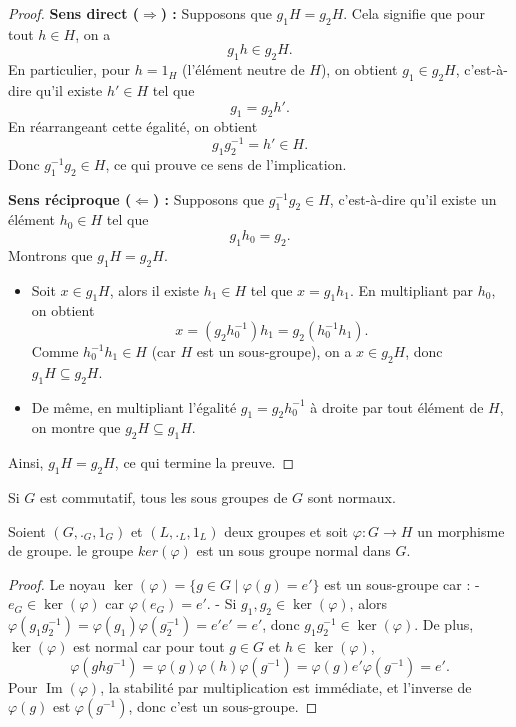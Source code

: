 \begin{proof}
\textbf{Sens direct (\(\Rightarrow\)) :}  
Supposons que \( g_1H = g_2H \). Cela signifie que pour tout \( h \in H \), on a  
\[
g_1 h \in g_2 H.
\]
En particulier, pour \( h = 1_H \) (l’élément neutre de \( H \)), on obtient \( g_1 \in g_2H \), c’est-à-dire qu’il existe \( h' \in H \) tel que  
\[
g_1 = g_2 h'.
\]
En réarrangeant cette égalité, on obtient  
\[
g_1 g_2^{-1} = h' \in H.
\]
Donc \( g_1^{-1} g_2 \in H \), ce qui prouve ce sens de l’implication.

\textbf{Sens réciproque (\(\Leftarrow\)) :}  
Supposons que \( g_1^{-1} g_2 \in H \), c’est-à-dire qu’il existe un élément \( h_0 \in H \) tel que  
\[
g_1 h_0 = g_2.
\]
Montrons que \( g_1H = g_2H \).  
\begin{itemize}
    \item Soit \( x \in g_1 H \), alors il existe \( h_1 \in H \) tel que \( x = g_1 h_1 \).  
    En multipliant par \( h_0 \), on obtient  
    \[
    x = (g_2 h_0^{-1}) h_1 = g_2 (h_0^{-1} h_1).
    \]
    Comme \( h_0^{-1} h_1 \in H \) (car \( H \) est un sous-groupe), on a \( x \in g_2H \), donc \( g_1H \subseteq g_2H \).
    \item De même, en multipliant l'égalité \( g_1 = g_2 h_0^{-1} \) à droite par tout élément de \( H \), on montre que \( g_2H \subseteq g_1H \).
\end{itemize}

Ainsi, \( g_1H = g_2H \), ce qui termine la preuve.  
\end{proof}

\begin{remarque}
    Si $G$ est commutatif, tous les sous groupes de $G$ sont normaux.
\end{remarque}

\begin{proposition}
Soient $(G,._G,1_G)$ et $(L,._L,1_L)$ deux groupes et soit $\varphi:G\to H$ un morphisme de groupe. le groupe $ker(\varphi)$ est un sous groupe normal dans $G$.
\end{proposition}

\begin{proof}
    Le noyau $\ker(\varphi) = \{ g \in G \mid \varphi(g) = e' \}$ est un sous-groupe car :
- $e_G \in \ker(\varphi)$ car $\varphi(e_G) = e'$.
- Si $g_1, g_2 \in \ker(\varphi)$, alors $\varphi(g_1 g_2^{-1}) = \varphi(g_1) \varphi(g_2^{-1}) = e' e' = e'$, donc $g_1 g_2^{-1} \in \ker(\varphi)$.\newline
De plus, $\ker(\varphi)$ est normal car pour tout $g \in G$ et $h \in \ker(\varphi)$,
\[
    \varphi(g h g^{-1}) = \varphi(g) \varphi(h) \varphi(g^{-1}) = \varphi(g) e' \varphi(g^{-1}) = e'.
\]
Pour $\operatorname{Im}(\varphi)$, la stabilité par multiplication est immédiate, et l'inverse de $\varphi(g)$ est $\varphi(g^{-1})$, donc c'est un sous-groupe.
\end{proof}

